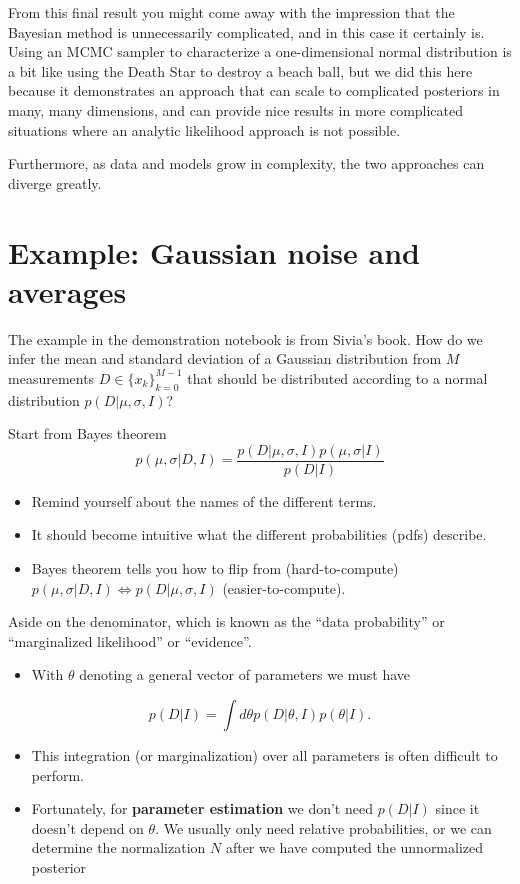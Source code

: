 \documentclass[%
oneside,                 %
final,                   %
10pt]{article}
\begin{document}
From this final result you might come away with the impression that the Bayesian method is unnecessarily complicated, and in this case it certainly is. Using an MCMC sampler to characterize a one-dimensional normal distribution is a bit like using the Death Star to destroy a beach ball, but we did this here because it demonstrates an approach that can scale to complicated posteriors in many, many dimensions, and can provide nice results in more complicated situations where an analytic likelihood approach is not possible.

Furthermore, as data and models grow in complexity, the two approaches can diverge greatly. 



\section{Example: Gaussian noise and averages}
The example in the demonstration notebook is from Sivia's book. How do we infer the mean and standard deviation of a Gaussian distribution from $M$ measurements $D \in \{ x_k \}_{k=0}^{M-1}$ that should be distributed according to a normal distribution $p( D | \mu,\sigma,I)$?

Start from Bayes theorem
\[
p(\mu,\sigma | D, I) = \frac{p(D|\mu,\sigma,I) p(\mu,\sigma|I)}{p(D|I)}
\]
\begin{itemize}
\item Remind yourself about the names of the different terms.

\item It should become intuitive what the different probabilities (pdfs) describe.

\item Bayes theorem tells you how to flip from (hard-to-compute) $p(\mu,\sigma | D, I) \Leftrightarrow p(D|\mu,\sigma,I)$ (easier-to-compute).
\end{itemize}

\noindent
Aside on the denominator, which is known as the ``data probability'' or ``marginalized likelihood'' or ``evidence''. 
\begin{itemize}
\item With $\theta$ denoting a general vector of parameters we must have
\end{itemize}

\noindent
\[
p(D|I) = \int d\theta p(D|\theta,I) p(\theta|I).
\]
\begin{itemize}
\item This integration (or marginalization) over all parameters is often difficult to perform.

\item Fortunately, for \textbf{parameter estimation} we don't need $p(D|I)$ since it doesn't depend on $\theta$. We usually only need relative probabilities, or we can determine the normalization $N$ after we have computed the unnormalized posterior 
\end{itemize}
\end{document}
